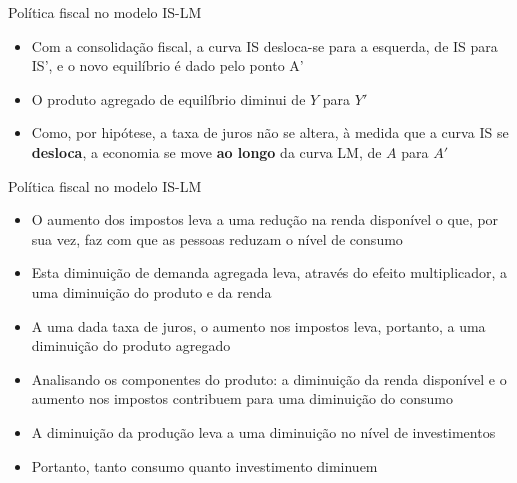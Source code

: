 \documentclass[10pt]{beamer}
\begin{document}
\begin{frame}{Política fiscal no modelo IS-LM}
    \begin{itemize}
        \item Com a consolidação fiscal, a curva IS desloca-se para a esquerda, de IS para IS', e o novo equilíbrio é dado pelo ponto A'
        \bigskip
        \item O produto agregado de equilíbrio diminui de $Y$ para $Y'$
        \bigskip
        \item Como, por hipótese, a taxa de juros não se altera, à medida que a curva IS se \textbf{desloca}, a economia se move \textbf{ao longo} da curva LM, de $A$ para $A'$
    \end{itemize}
\end{frame}

\begin{frame}{Política fiscal no modelo IS-LM}
    \begin{itemize}
        \item O aumento dos impostos leva a uma redução na renda disponível o que, por sua vez, faz com que as pessoas reduzam o nível de consumo
        \bigskip
        \item Esta diminuição de demanda agregada leva, através do efeito multiplicador, a uma diminuição do produto e da renda
        \bigskip
        \item A uma dada taxa de juros, o aumento nos impostos leva, portanto, a uma diminuição do produto agregado
        \bigskip
        \item Analisando os componentes do produto: a diminuição da renda disponível e o aumento nos impostos contribuem para uma diminuição do consumo
        \bigskip
        \item A diminuição da produção leva a uma diminuição no nível de investimentos
        \bigskip
        \item Portanto, tanto consumo quanto investimento diminuem
    \end{itemize}
\end{frame}
\end{document}
